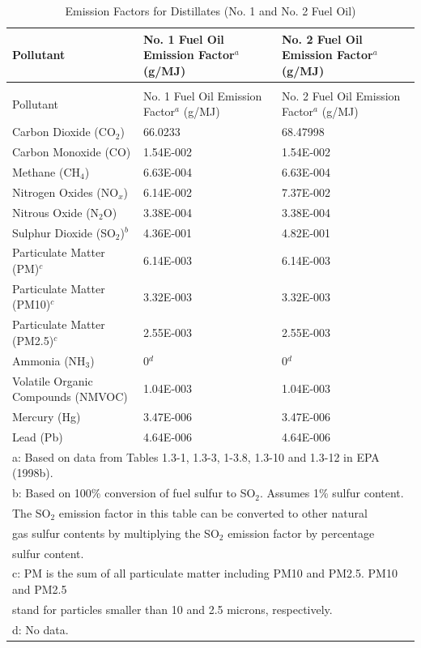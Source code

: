 \begin{longtable}[c]{p{3.0in}p{1.5in}p{1.5in}}
\caption{Emission Factors for Distillates (No. 1 and No. 2 Fuel Oil) \label{table:emission-factors-for-distillates-no.-1}} \tabularnewline
\toprule
Pollutant & No. 1 Fuel Oil Emission Factor\(^a\)   (g/MJ) & No. 2 Fuel Oil Emission Factor\(^a\)   (g/MJ) \tabularnewline
\midrule
\endfirsthead

\caption[]{Emission Factors for Distillates (No. 1 and No. 2 Fuel Oil)} \tabularnewline
\toprule
Pollutant & No. 1 Fuel Oil Emission Factor\(^a\)   (g/MJ) & No. 2 Fuel Oil Emission Factor\(^a\)   (g/MJ) \tabularnewline
\midrule
\endhead

Carbon Dioxide (CO\(_2\)) & 66.0233 & 68.47998 \tabularnewline
Carbon Monoxide (CO) & 1.54E-002 & 1.54E-002 \tabularnewline
Methane (CH\(_4\)) & 6.63E-004 & 6.63E-004 \tabularnewline
Nitrogen Oxides (NO\(_x\)) & 6.14E-002 & 7.37E-002 \tabularnewline
Nitrous Oxide (N\(_2\)O) & 3.38E-004 & 3.38E-004 \tabularnewline
Sulphur Dioxide (SO\(_2\))\(^b\) & 4.36E-001 & 4.82E-001 \tabularnewline
Particulate Matter (PM)\(^c\) & 6.14E-003 & 6.14E-003 \tabularnewline
Particulate Matter (PM10)\(^c\) & 3.32E-003 & 3.32E-003 \tabularnewline
Particulate Matter (PM2.5)\(^c\) & 2.55E-003 & 2.55E-003 \tabularnewline
Ammonia (NH\(_3\)) & 0\(^d\) & 0\(^d\) \tabularnewline
Volatile Organic Compounds (NMVOC) & 1.04E-003 & 1.04E-003 \tabularnewline
Mercury (Hg) & 3.47E-006 & 3.47E-006 \tabularnewline
Lead (Pb) & 4.64E-006 & 4.64E-006 \tabularnewline
\midrule
\multicolumn{3}{l}{a: Based on data from Tables 1.3-1, 1.3-3, 1-3.8, 1.3-10 and 1.3-12 in EPA (1998b).} \tabularnewline
\multicolumn{3}{l}{b: Based on 100\% conversion of fuel sulfur to SO\(_2\). Assumes 1\% sulfur content.} \tabularnewline
\multicolumn{3}{l}{The SO\(_2\) emission factor in this table can be converted to other natural} \tabularnewline
\multicolumn{3}{l}{gas sulfur contents by multiplying the SO\(_2\) emission factor by percentage} \tabularnewline
\multicolumn{3}{l}{sulfur content.} \tabularnewline
\multicolumn{3}{l}{c: PM is the sum of all particulate matter including PM10 and PM2.5. PM10 and PM2.5} \tabularnewline
\multicolumn{3}{l}{stand for particles smaller than 10 and 2.5 microns, respectively.} \tabularnewline
\multicolumn{3}{l}{d: No data.} \tabularnewline
\bottomrule
\end{longtable}

